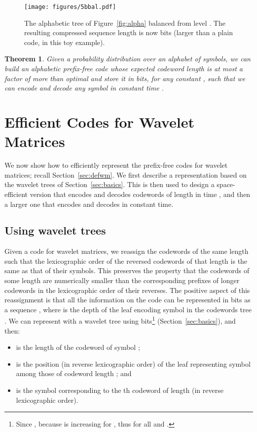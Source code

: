 \documentclass[preprint,12pt]{elsarticle}
\newtheorem{theorem}{Theorem}
\begin{document}
\begin{figure}[t]
\begin{center}
\texttt{[image: figures/5bbal.pdf]}
\end{center}
\vspace*{-5mm}
\caption{The alphabetic tree of Figure~\ref{fig:alpha} balanced from
level . The resulting compressed sequence length is now  bits (larger
than a plain code, in this toy example).}
\label{fig:alphabal}
\end{figure}

\begin{theorem}
\label{thm:nearly_optimal}
Given a probability distribution over an alphabet of  symbols, we can build an alphabetic prefix-free code whose expected codeword length is at most a factor of  more than optimal and store it in  bits, for any constant , such that we can encode and decode any symbol in constant time .
\end{theorem}

\section{Efficient Codes for Wavelet Matrices}
\label{sec:matrices}

We now show how to efficiently represent the prefix-free codes for wavelet 
matrices; recall Section~\ref{sec:defwm}. We first describe a representation
based on the wavelet trees of Section~\ref{sec:basics}. This is then used to
design a space-efficient version that encodes and decodes codewords of length 
 in time , and then a larger one that encodes and decodes
in constant time.

\subsection{Using wavelet trees}

Given a code for wavelet matrices, we reassign the codewords of the same length such that the lexicographic order of the reversed codewords of that length is the same as that of their symbols. This preserves the property that the codewords
of some length are numerically smaller than the corresponding prefixes of 
longer codewords in the lexicographic order of their reverses. The positive
aspect of this reassignment is that all the information on the code can be 
represented in  bits as a sequence , 
where  is the depth of the leaf encoding symbol  in the codewords tree 
. We can represent  with a wavelet tree using  bits\footnote{Since ,  because
 is increasing for , thus 
for all  and .}
(Section~\ref{sec:basics}), and then:
\begin{itemize}
\item  is the length  of the codeword of symbol ; 
\item  is the position (in reverse lexicographic order) of the 
leaf representing symbol  among those of codeword length ; and 
\item  is the symbol corresponding to the th codeword 
of length  (in reverse lexicographic order).
\end{itemize}
\end{document}
